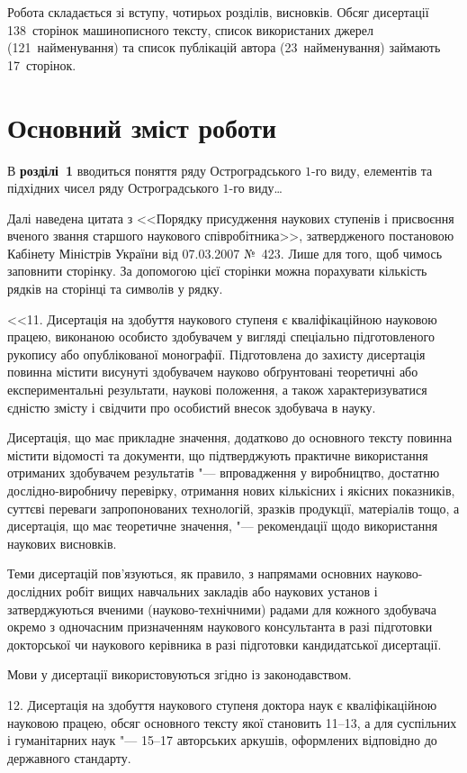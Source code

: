 \documentclass[
]{mon2017dev-aref}[2021/07/21]
\theoremstyle{plain}
\theoremstyle{definition}
\theoremstyle{remark}
\begin{document}
Робота складається зі вступу, чотирьох розділів, висновків. Обсяг
дисертації 138~сторінок машинописного тексту, список використаних
джерел (121~найменування) та список публікацій автора
(23~найменування) займають 17~сторінок.


\part{Основний зміст роботи}

В \textbf{розділі~1} вводиться поняття ряду Остроградського $1$-го
виду, елементів та підхідних чисел ряду Остроградського $1$-го
виду\ldots

Далі наведена цитата з <<Порядку присудження наукових ступенів і
присвоєння вченого звання старшого наукового співробітника>>,
затвердженого постановою Кабінету Міністрів України від 07.03.2007
№~423. Лише для того, щоб чимось заповнити сторінку. За допомогою
цієї сторінки можна порахувати кількість рядків на сторінці та
символів у рядку.

<<11. Дисертація на здобуття наукового ступеня є кваліфікаційною
науковою працею, виконаною особисто здобувачем у вигляді
спеціально підготовленого рукопису або опублікованої монографії.
Підготовлена до захисту дисертація повинна містити висунуті
здобувачем науково обґрунтовані теоретичні або експериментальні
результати, наукові положення, а також характеризуватися єдністю
змісту і свідчити про особистий внесок здобувача в науку.

Дисертація, що має прикладне значення, додатково до основного
тексту повинна містити відомості та документи, що підтверджують
практичне використання отриманих здобувачем результатів "---
впровадження у виробництво, достатню дослідно-виробничу перевірку,
отримання нових кількісних і якісних показників, суттєві переваги
запропонованих технологій, зразків продукції, матеріалів тощо, а
дисертація, що має теоретичне значення, "--- рекомендації щодо
використання наукових висновків.

Теми дисертацій пов'язуються, як правило, з напрямами основних
науково-дослідних робіт вищих навчальних закладів або наукових
установ і затверджуються вченими (науково-технічними) радами для
кожного здобувача окремо з одночасним призначенням наукового
консультанта в разі підготовки докторської чи наукового керівника
в разі підготовки кандидатської дисертації.

Мови у дисертації використовуються згідно із законодавством.

12. Дисертація на здобуття наукового ступеня доктора наук є
кваліфікаційною науковою працею, обсяг основного тексту якої
становить 11--13, а для суспільних і гуманітарних наук "--- 15--17
авторських аркушів, оформлених відповідно до державного стандарту.
\end{document}
